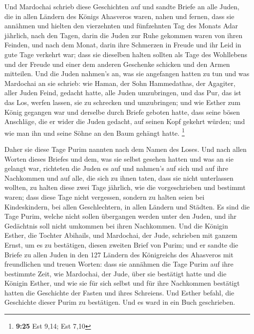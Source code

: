  Und Mardochai schrieb diese Geschichten auf und sandte
Briefe an alle Juden, die in allen Ländern des Königs Ahasveros waren,
nahen und fernen,  dass sie annähmen und hielten den
vierzehnten und fünfzehnten Tag des Monats Adar jährlich,
 nach den Tagen, darin die Juden zur Ruhe gekommen waren
von ihren Feinden, und nach dem Monat, darin ihre Schmerzen in Freude
und ihr Leid in gute Tage verkehrt war; dass sie dieselben halten
sollten als Tage des Wohllebens und der Freude und einer dem anderen
Geschenke schicken und den Armen mitteilen.  Und die
Juden nahmen's an, was sie angefangen hatten zu tun und was Mardochai an
sie schrieb:  wie Haman, der Sohn Hammedathas, der
Agagiter, aller Juden Feind, gedacht hatte, alle Juden umzubringen, und
das Pur, das ist das Los, werfen lassen, sie zu schrecken und
umzubringen;  und wie Esther zum König gegangen war und
derselbe durch Briefe geboten hatte, dass seine bösen Anschläge, die er
wider die Juden gedacht, auf seinen Kopf gekehrt würden; und wie man ihn
und seine Söhne an den Baum gehängt hatte. \footnote{\textbf{9:25} Est
  9,14; Est 7,10}

 Daher sie diese Tage Purim nannten nach dem Namen des
Loses. Und nach allen Worten dieses Briefes und dem, was sie selbst
gesehen hatten und was an sie gelangt war,  richteten die
Juden es auf und nahmen's auf sich und auf ihre Nachkommen und auf alle,
die sich zu ihnen taten, dass sie nicht unterlassen wollten, zu halten
diese zwei Tage jährlich, wie die vorgeschrieben und bestimmt waren;
 dass diese Tage nicht vergessen, sondern zu halten seien
bei Kindeskindern, bei allen Geschlechtern, in allen Ländern und
Städten. Es sind die Tage Purim, welche nicht sollen übergangen werden
unter den Juden, und ihr Gedächtnis soll nicht umkommen bei ihren
Nachkommen.  Und die Königin Esther, die Tochter
Abihails, und Mardochai, der Jude, schrieben mit ganzem Ernst, um es zu
bestätigen, diesen zweiten Brief von Purim;  und er
sandte die Briefe zu allen Juden in den 127 Ländern des Königreichs des
Ahasveros mit freundlichen und treuen Worten:  dass sie
annähmen die Tage Purim auf ihre bestimmte Zeit, wie Mardochai, der
Jude, über sie bestätigt hatte und die Königin Esther, und wie sie für
sich selbst und für ihre Nachkommen bestätigt hatten die Geschichte der
Fasten und ihres Schreiens.  Und Esther befahl, die
Geschichte dieser Purim zu bestätigen. Und es ward in ein Buch
geschrieben.

